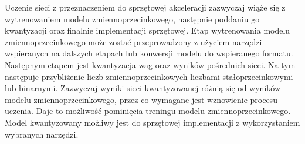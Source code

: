 Uczenie sieci z przeznaczeniem do sprzętowej akceleracji zazwyczaj wiąże się z wytrenowaniem modelu zmiennoprzecinkowego, następnie poddaniu go kwantyzacji oraz finalnie implementacji sprzętowej.
Etap wytrenowania modelu zmiennoprzecinkowego może zostać przeprowadzony z użyciem narzędzi wspieranych na dalszych etapach lub konwersji modelu do wspieranego formatu. 
Następnym etapem jest kwantyzacja wag oraz wyników pośrednich sieci. 
Na tym następuje przybliżenie liczb zmiennoprzecinkowych liczbami stałoprzecinkowymi lub binarnymi. 
Zazwyczaj wyniki sieci kwantyzowanej różnią się od wyników modelu zmiennoprzecinkowego, przez co wymagane jest wznowienie procesu uczenia.
Daje to możliwość pominięcia treningu modelu zmiennoprzecinkowego.
Model kwantyzowany możliwy jest do sprzętowej implementacji z wykorzystaniem wybranych narzędzi.

